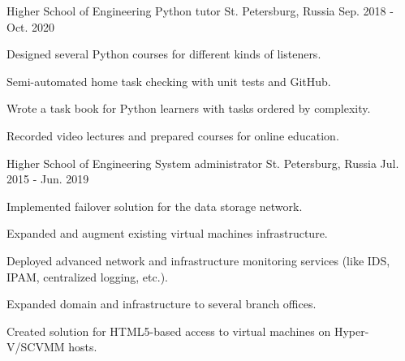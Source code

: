 \begin{cventries}
  \cventry
    {Higher School of Engineering} %
    {Python tutor} %
    {St. Petersburg, Russia} %
    {Sep. 2018 - Oct. 2020} %
    {
		\begin{cvitems} %
		 \item {Designed several Python courses for different kinds of listeners.}
		 \item {Semi-automated home task checking with unit tests and GitHub.}
		 \item {Wrote a task book for Python learners with tasks ordered by complexity.}
		 \item {Recorded video lectures and prepared courses for online education.}
		\end{cvitems}
    }

  \cventry
	{Higher School of Engineering} %
	{System administrator} %
	{St. Petersburg, Russia} %
	{Jul. 2015 - Jun. 2019} %
	{
		\begin{cvitems} %
			\item {Implemented failover solution for the data storage network.}
			\item {Expanded and augment existing virtual machines infrastructure.}
			\item {Deployed advanced network and infrastructure monitoring services (like IDS, IPAM, centralized logging, etc.).}
			\item {Expanded domain and infrastructure to several branch offices.}
			\item {Created solution for HTML5-based access to virtual machines on Hyper-V/SCVMM hosts.}
		\end{cvitems}
	}

\end{cventries}
